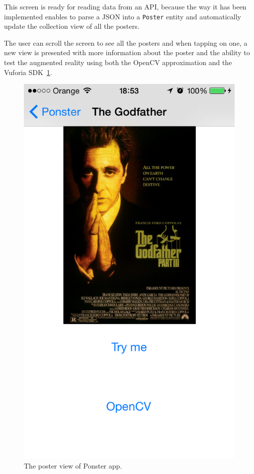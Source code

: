 This screen is ready for reading data from an API, because the way it has been
implemented enables to parse a JSON into a \texttt{Poster} entity and
automatically update the collection view of all the posters. 

The user can scroll the screen to see all the posters and when tapping on one,
a new view is presented with more information about the poster and the ability
to test the augmented reality using both the OpenCV approximation and the
Vuforia SDK~\ref{fig:posterview}.

\begin{figure}
\centering
\includegraphics[scale=0.55]{img/posterview.png}
\caption{\label{fig:posterview} The poster view of Ponster app.}
\end{figure} 

